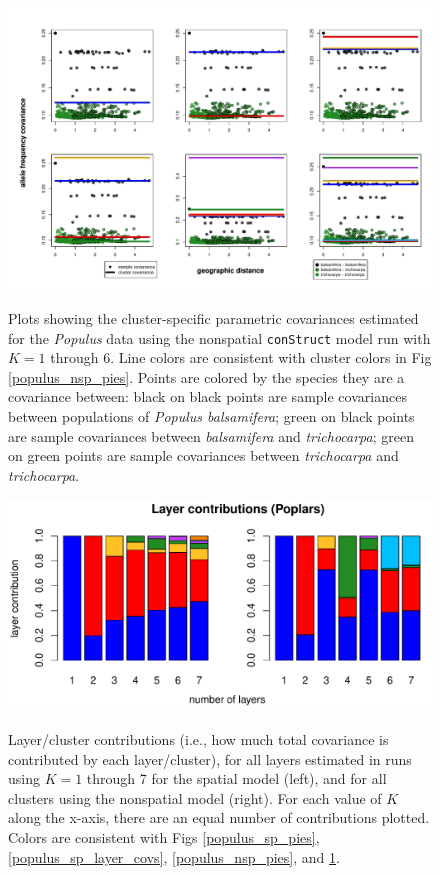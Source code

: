 \documentclass[10pt,letterpaper]{article}
\newcommand{\tri}{\textit{trichocarpa}}
\newcommand{\bals}{\textit{balsamifera}}
\begin{document}
\begin{figure}
	\centering
		{\includegraphics[width=\textwidth]{figs/populus/populus_nsp_layer_covs.pdf}}
	\caption{
	Plots showing the cluster-specific parametric covariances 
	estimated for the \textit{Populus} data using 
	the nonspatial \texttt{conStruct} model run with $K=1$ through 6.
	Line colors are consistent with cluster colors in Fig \ref{populus_nsp_pies}.
	Points are colored by the species they are a covariance between:
	black on black points are sample covariances between populations of \textit{Populus balsamifera};
	green on black points are sample covariances between \bals{} and \tri{};
	green on green points are sample covariances between \tri{} and \tri{}.
    }\label{populus_nsp_layer_covs}
\end{figure}

\begin{figure}
	\centering
		{\includegraphics[width=\textwidth]{figs/populus/populus_laycon_barplots.pdf}}
	\caption{
	Layer/cluster contributions (i.e., how much total covariance is contributed by each layer/cluster), 
	for all layers estimated in runs using $K = 1$ through 7 
	for the spatial model (left), 
	and for all clusters using the nonspatial model (right).
	For each value of $K$ along the x-axis, there are an equal number of contributions plotted.
	Colors are consistent with Figs \ref{populus_sp_pies}, \ref{populus_sp_layer_covs}, \ref{populus_nsp_pies}, and \ref{populus_nsp_layer_covs}.
    }\label{populus_laycon}
\end{figure}
\end{document}
